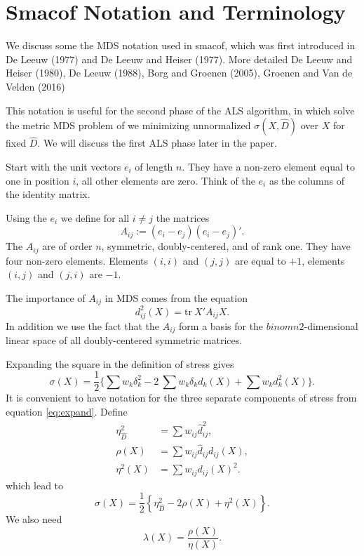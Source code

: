 \documentclass[
  12pt,
]{article}
\begin{document}
\section{Smacof Notation and Terminology}\label{smacof-notation-and-terminology}

We discuss some the MDS notation used in smacof, which was first introduced in De Leeuw (1977) and De Leeuw and Heiser (1977). More
detailed De Leeuw and Heiser (1980), De Leeuw (1988), Borg and Groenen (2005),
Groenen and Van de Velden (2016)

This notation is useful for the second phase of the ALS
algorithm, in which solve the metric MDS problem of we minimizing
unnormalized \(\sigma(X,\hat D)\) over \(X\) for fixed \(\hat D\). We will
discuss the first ALS phase later in the paper.

Start with the unit vectors \(e_i\) of length \(n\). They have a non-zero
element equal to one in position \(i\), all other elements are zero. Think
of the \(e_i\) as the columns of the identity matrix.

Using the \(e_i\) we define for all \(i\not= j\) the matrices
\begin{equation}
A_{ij}:=(e_i-e_j)(e_i-e_j)'.
\end{equation}
The \(A_{ij}\) are of order \(n\), symmetric,
doubly-centered, and of rank one. They have four non-zero elements.
Elements \((i,i)\) and \((j,j)\) are equal to \(+1\), elements \((i,j)\) and
\((j,i)\) are \(-1\).

The importance of \(A_{ij}\) in MDS comes from the equation
\begin{equation}
d_{ij}^2(X)=\text{tr}\ X'A_{ij}X.
\label{eq:dfroma}
\end{equation}
In addition we use the fact that the \(A_{ij}\) form a
basis for the \(binom{n}{2}\)-dimensional linear space of all
doubly-centered symmetric matrices.

Expanding the square in the definition of stress gives
\begin{equation}
\sigma(X)=\frac12\{\sum   w_k\delta_k^2-2\ \sum   w_k\delta_kd_k(X)+\sum   w_kd_k^2(X)\}.
\label{eq:expand}
\end{equation}
It is convenient to have notation for the three separate
components of stress from equation \eqref{eq:expand}. Define
\begin{align}
\eta_{\hat D}^2&=\sum   w_{ij}\hat d_{ij}^2,\label{eq:condef}\\
\rho(X)&=\sum   w_{ij}\hat d_{ij}d_{ij}(X),\label{eq:rhodef}\\
\eta^2(X)&=\sum   w_{ij}d_{ij}(X)^2.\label{eq:etadef}
\end{align}
which lead to
\begin{equation}
\sigma(X)=\frac12\left\{\eta_{\hat D}^2-2\rho(X)+\eta^2(X)\right\}.
\label{eq:stressshort}
\end{equation}
We also need
\begin{equation}
\lambda(X)=\frac{\rho(X)}{\eta(X)}.
\label{eq:lambdadef}
\end{equation}
\end{document}
